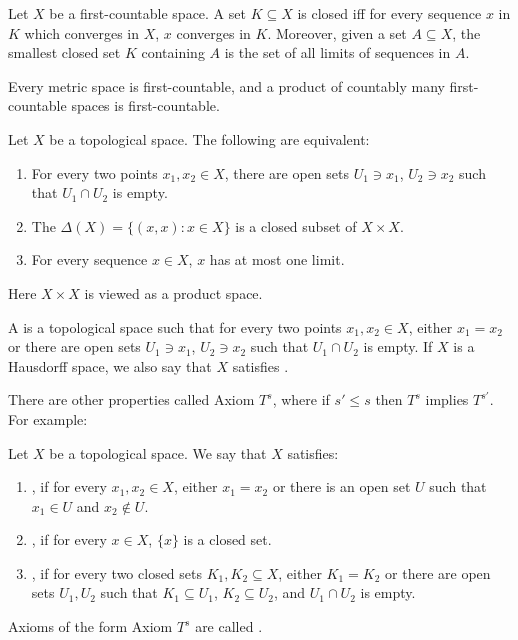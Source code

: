 \begin{lemma}
Let $X$ be a first-countable space.
A set $K \subseteq X$ is closed iff for every sequence $x$ in $K$ which converges in $X$, $x$ converges in $K$.
Moreover, given a set $A \subseteq X$, the smallest closed set $K$ containing $A$ is the set of all limits of sequences in $A$.
\end{lemma}

\begin{lemma}
Every metric space is first-countable, and a product of countably many first-countable spaces is first-countable.
\end{lemma}

\begin{lemma}
Let $X$ be a topological space. The following are equivalent:
\begin{enumerate}
\item For every two points $x_{1}, x_{2} \in X$, there are open sets $U_{1} \ni x_{1}$, $U_{2} \ni x_{2}$ such that $U_{1} \cap U_{2}$ is empty.
\item The  $\Delta(X) = \{(x, x): x \in X\}$ is a closed subset of $X \times X$.
\item For every sequence $x \in X$, $x$ has at most one limit.
\end{enumerate}
Here $X \times X$ is viewed as a product space.
\end{lemma}

\begin{definition}
A  is a topological space such that for every two points $x_{1}, x_{2} \in X$, either $x_{1} = x_{2}$ or there are open sets $U_{1} \ni x_{1}$, $U_{2} \ni x_{2}$ such that $U_{1} \cap U_{2}$ is empty.
If $X$ is a Hausdorff space, we also say that $X$ satisfies .
\end{definition}

\begin{subsec}
There are other properties called Axiom $T^{s}$, where if $s' \leq s$ then $T^{s}$ implies $T^{s'}$. For example:
\end{subsec}

\begin{definition}
Let $X$ be a topological space. We say that $X$ satisfies:
\begin{enumerate}
\item {}, if for every $x_{1}, x_{2} \in X$, either $x_{1} = x_{2}$ or there is an open set $U$ such that $x_{1} \in U$ and $x_{2} \notin U$.
\item {}, if for every $x \in X$, $\{x\}$ is a closed set.
\item {}, if for every two closed sets $K_{1}, K_{2} \subseteq X$, either $K_{1} = K_{2}$ or there are open sets $U_{1}, U_{2}$ such that $K_{1} \subseteq U_{1}$, $K_{2} \subseteq U_{2}$, and $U_{1} \cap U_{2}$ is empty.
\end{enumerate}
Axioms of the form Axiom $T^{s}$ are called .
\end{definition}


